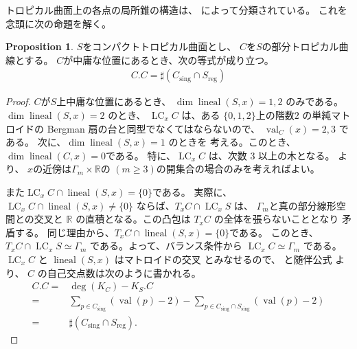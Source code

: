 \documentclass[a4paper,dvipdfmx,reqno,12pt]{amsart}
\theoremstyle{definition}
\newtheorem{proposition}[theorem]{Proposition}
\newcommand{\opn}[1]{\operatorname{#1}}
\numberwithin{equation}{section}
\begin{document}
トロピカル曲面上の各点の局所錐の構造は、
\cite[Corollary 2.4]{shaw2015tropical}
によって分類されている。
これを念頭に次の命題を解く。

\begin{proposition}
\label{proposition-self-intersection}
$S$をコンパクトトロピカル曲面とし、
$C$を$S$の部分トロピカル曲線とする。
$C$が中庸な位置にあるとき、次の等式が成り立つ。
\begin{align}
     C.C=\sharp (C_{\mathrm{sing}}\cap S_{\mathrm{reg}})
\end{align}
\end{proposition}
\begin{proof}
$C$が$S$上中庸な位置にあるとき、
$\dim \opn{lineal}(S,x)=1,2$ のみである。
$\dim \opn{lineal}(S,x)=2$ のとき、
$\opn{LC}_x C$ は、ある
$\{0,1,2\}$上の階数$2$
の単純マトロイドの
Bergman 扇の台と同型でなくてはならないので、
$\opn{val}_C(x)=2,3$ である。
次に、$\dim \opn{lineal}(S,x)=1$ のときを
考える。このとき、
$\dim \opn{lineal}(C,x)=0$である。
特に、$\opn{LC}_x C$ は、次数 $3$ 以上の木となる。
\cite[Corollary 2.4]{shaw2015tropical} 
より、
$x$の近傍は$\Gamma_m\times \mathbb{R}$の
$(m\geq 3)$の開集合の場合のみを考えればよい。

また$\opn{LC}_x C\cap \opn{lineal}(S,x)=\{0\}$である。
実際に、$\opn{LC}_x C\cap \opn{lineal}(S,x)\ne \{0\}$
ならば、$T_x C \cap \opn{LC}_x S$ は、
$\Gamma_m$と真の部分線形空間との交叉と $\mathbb{R}$
の直積となる。この凸包は $T_x C$ の全体を張らないこととなり
矛盾する。
同じ理由から、$T_x C\cap \opn{lineal}(S,x)=\{0\}$である。
このとき、$T_x C\cap \opn{LC}_x S\simeq \Gamma_m$
である。よって、バランス条件から
$\opn{LC}_x C\simeq \Gamma_m$ である。
$\opn{LC}_x C$ と $\opn{lineal}(S,x)$ はマトロイドの交叉
とみなせるので、\cite[Theorem 4.2]{MR3032930}
と随伴公式\cite[Theorem 4.11]{shaw2015tropical} より、
$C$ の自己交点数は次のように書かれる。
\begin{align}
C . C=&\opn{deg}(K_C)-K_S . C \\
=& \sum_{p\in C_{\mathrm{sing}}}(\opn{val}(p)-2)
- \sum_{p\in C_{\mathrm{sing}}\cap S_{\mathrm{sing}}}
(\opn{val}(p)-2) \\
=& \sharp (C_{\mathrm{sing}}\cap S_{\mathrm{reg}}).
\end{align}

\end{proof}
\end{document}
